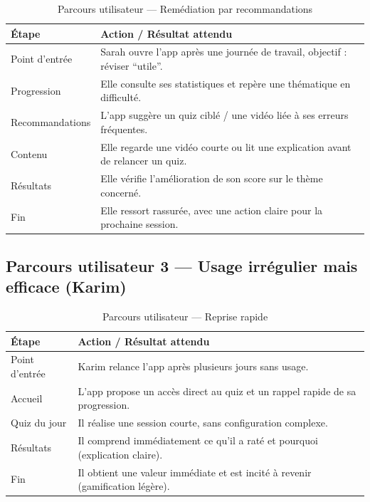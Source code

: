 \begin{table}[h!]
\centering
\renewcommand{\arraystretch}{1.15}
\small
\begin{tabular}{|p{3.2cm}|p{10.4cm}|}
\hline
\rowcolor{black!10}
\textbf{Étape} & \textbf{Action / Résultat attendu} \\ \hline
Point d’entrée & Sarah ouvre l’app après une journée de travail, objectif : réviser ``utile''. \\ \hline
Progression & Elle consulte ses statistiques et repère une thématique en difficulté. \\ \hline
Recommandations & L’app suggère un quiz ciblé / une vidéo liée à ses erreurs fréquentes. \\ \hline
Contenu & Elle regarde une vidéo courte ou lit une explication avant de relancer un quiz. \\ \hline
Résultats & Elle vérifie l’amélioration de son score sur le thème concerné. \\ \hline
Fin & Elle ressort rassurée, avec une action claire pour la prochaine session. \\ \hline
\end{tabular}
\caption{Parcours utilisateur — Remédiation par recommandations}
\end{table}

\subsection{Parcours utilisateur 3 — Usage irrégulier mais efficace (Karim)}

\begin{table}[h!]
\centering
\renewcommand{\arraystretch}{1.15}
\small
\begin{tabular}{|p{3.2cm}|p{10.4cm}|}
\hline
\rowcolor{black!10}
\textbf{Étape} & \textbf{Action / Résultat attendu} \\ \hline
Point d’entrée & Karim relance l’app après plusieurs jours sans usage. \\ \hline
Accueil & L’app propose un accès direct au quiz et un rappel rapide de sa progression. \\ \hline
Quiz du jour & Il réalise une session courte, sans configuration complexe. \\ \hline
Résultats & Il comprend immédiatement ce qu’il a raté et pourquoi (explication claire). \\ \hline
Fin & Il obtient une valeur immédiate et est incité à revenir (gamification légère). \\ \hline
\end{tabular}
\caption{Parcours utilisateur — Reprise rapide}
\end{table}

